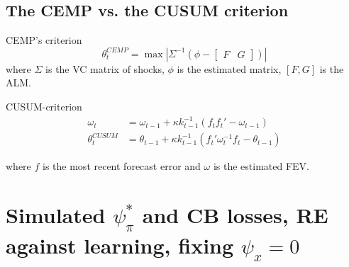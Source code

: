 \documentclass[11pt]{article}
\renewcommand{\[}{\begin{equation}}
\renewcommand{\]}{\end{equation}}
\begin{document}
\subsection{The CEMP vs. the CUSUM criterion}

CEMP's criterion  
\begin{equation}
\theta_t^{CEMP} = \max | \Sigma^{-1} ( \phi - \begin{bmatrix} F & G \end{bmatrix}) |
\end{equation}
where $\Sigma$ is the VC matrix of shocks, $\phi$ is the estimated matrix, $[F,G]$ is the ALM.

\noindent CUSUM-criterion
\begin{align}
\omega_t & =  \omega_{t-1} + \kappa k_{t-1}^{-1}(f_t f_t'  -\omega_{t-1})\\
\theta_t^{CUSUM} & =  \theta_{t-1} + \kappa k_{t-1}^{-1}(f_t'\omega_t^{-1}f_t -\theta_{t-1})
\end{align}

where $f$ is the most recent forecast error and $\omega$ is the estimated FEV. 



\newpage
\section{Simulated $\psi_{\pi}^*$ and CB losses, RE against learning, fixing $\psi_x = 0$}
\end{document}
